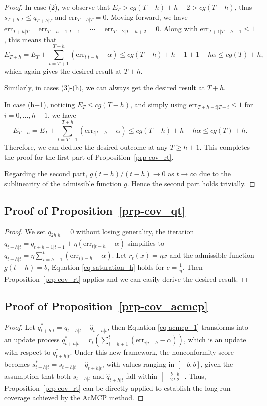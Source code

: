\documentclass[
  11pt,
  12pt]{article}
\theoremstyle{plain}
\theoremstyle{remark}
\begin{document}
\begin{proof}
In case (2), we observe that \(E_T > cg(T-h)+h-2 > cg(T-h)\), thus
\(s_{T+h|T} \leq q_{T+h|T}\) and \(\mathrm{err}_{T+h|T} = 0\). Moving
forward, we have
\(\mathrm{err}_{T+h|T} = \mathrm{err}_{T+h-1|T-1} = \cdots = \mathrm{err}_{T+2|T-h+2} = 0\).
Along with \(\mathrm{err}_{T+1|T-h+1} \leq 1\), this means that \[
E_{T+h} = E_T+\sum_{t=T+1}^{T+h}(\mathrm{err}_{t|t-h}-\alpha) \leq cg(T-h)+h-1+1-h\alpha \leq cg(T)+h,
\] which again gives the desired result at \(T+h\).

Similarly, in cases (3)-(h), we can always get the desired result at
\(T+h\).

In case (h+1), noticing \(E_T \leq cg(T-h)\), and simply using
\(\mathrm{err}_{T+h-i|T-i} \leq 1\) for \(i=0,\ldots,h-1\), we have \[
E_{T+h} = E_T+\sum_{t=T+1}^{T+h}(\mathrm{err}_{t|t-h}-\alpha) \leq cg(T-h)+h-h\alpha \leq cg(T)+h.
\] Therefore, we can deduce the desired outcome at any \(T \geq h+1\).
This completes the proof for the first part of
Proposition~\ref{prp-cov_rt}.

Regarding the second part, \(g(t-h)/(t-h) \rightarrow 0\) as
\(t \rightarrow \infty\) due to the sublinearity of the admissible
function \(g\). Hence the second part holds trivially.
\end{proof}

\subsection{\texorpdfstring{Proof of
Proposition~\ref{prp-cov_qt}}{Proof of Proposition~}}\label{sec-proof_cov_qt}

\begin{proof}
We set \(q_{2h|h}=0\) without losing generality, the iteration
\(q_{t+h|t}=q_{t+h-1|t-1}+\eta (\mathrm{err}_{t|t-h}-\alpha)\)
simplifies to
\(q_{t+h|t}=\eta \sum_{i=h+1}^{t}(\mathrm{err}_{i|i-h}-\alpha)\). Let
\(r_t(x) = \eta x\) and the admissible function \(g(t-h) = b\), Equation
\eqref{eq-saturation_h} holds for \(c=\frac{1}{\eta}\). Then
Proposition~\ref{prp-cov_rt} applies and we can easily derive the
desired result.
\end{proof}

\subsection{\texorpdfstring{Proof of
Proposition~\ref{prp-cov_acmcp}}{Proof of Proposition~}}\label{sec-proof_cov_acmcp}

\begin{proof}
Let \(q_{t+h|t}^{*}=q_{t+h|t}-\hat{q}_{t+h|t}\), then Equation
\eqref{eq-acmcp_1} transforms into an update process
\(q_{t+h|t}^{*}=r_t\left(\sum_{i=h+1}^t (\mathrm{err}_{i|i-h}-\alpha)\right)\),
which is an update with respect to \(q_{t+h|t}^{*}\). Under this new
framework, the nonconformity score becomes
\(s_{t+h|t}^{*}=s_{t+h|t}-\hat{q}_{t+h|t}\), with values ranging in
\([-b,b]\), given the assumption that both \(s_{t+h|t}\) and
\(\hat{q}_{t+h|t}\) fall within \([-\frac{b}{2},\frac{b}{2}]\). Thus,
Proposition~\ref{prp-cov_rt} can be directly applied to establish the
long-run coverage achieved by the AcMCP method.
\end{proof}
\end{document}
